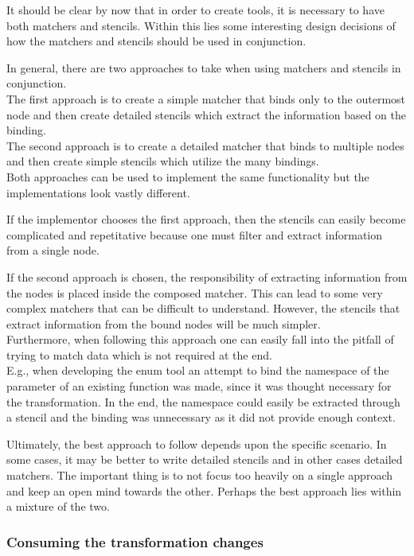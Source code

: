 It should be clear by now that in order to create tools, it is necessary to have both matchers and stencils. Within this lies some interesting design decisions of how the matchers and stencils should be used in conjunction.

In general, there are two approaches to take when using matchers and stencils in conjunction.\\
The first approach is to create a simple matcher that binds only to the outermost node and then create detailed stencils which extract the information based on the binding.\\
The second approach is to create a detailed matcher that binds to multiple nodes and then create simple stencils which utilize the many bindings.\\
Both approaches can be used to implement the same functionality but the implementations look vastly different.

If the implementor chooses the first approach, then the stencils can easily become complicated and repetitative because one must filter and extract information from a single node.

If the second approach is chosen, the responsibility of extracting information from the nodes is placed inside the composed matcher. This can lead to some very complex matchers that can be difficult to understand. However, the stencils that extract information from the bound nodes will be much simpler.\\
Furthermore, when following this approach one can easily fall into the pitfall of trying to match data which is not required at the end.\\
E.g., when developing the enum tool an attempt to bind the namespace of the parameter of an existing  function was made, since it was thought necessary for the transformation. In the end, the namespace could easily be extracted through a stencil and the binding was unnecessary as it did not provide enough context.

Ultimately, the best approach to follow depends upon the specific scenario. In some cases, it may be better to write detailed stencils and in other cases detailed matchers. The important thing is to not focus too heavily on a single approach and keep an open mind towards the other. Perhaps the best approach lies within a mixture of the two.

\subsubsection*{Consuming the transformation changes} \label{subsubsec:080dev:Consumers}

